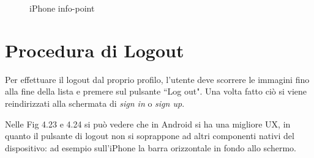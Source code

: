 \begin{figure}[H]
\begin{minipage}[h]{0.47\textwidth}
        \caption{\label{infoPointIphone} iPhone info-point}
    \end{minipage}
\end{figure}

\section*{Procedura di Logout}
Per effettuare il logout dal proprio profilo, l'utente deve scorrere le immagini fino alla fine della lista e premere sul pulsante ``Log out". Una volta fatto ci\`o si viene reindirizzati alla schermata di \textit{sign in} o \textit{sign up}.

Nelle Fig 4.23 e 4.24 si pu\`o vedere che in Android si ha una migliore UX, in quanto il pulsante di logout non si soprappone ad altri componenti nativi del dispositivo: ad esempio sull'iPhone la barra orizzontale in fondo allo schermo. 
